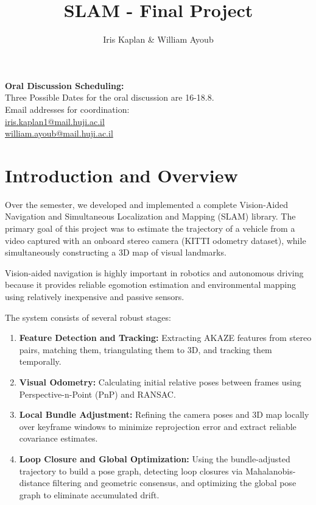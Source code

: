 \documentclass[12pt]{article}
\begin{document}
\title{SLAM - Final Project}
\author{Iris Kaplan \& William Ayoub}
\maketitle

\tableofcontents
\newpage

\vspace*{1em}
\noindent
\textbf{Oral Discussion Scheduling:} \\
Three Possible Dates for the oral discussion are 16-18.8. \\
Email addresses for coordination: \\
\href{mailto:iris.kaplan1@mail.huji.ac.il}{iris.kaplan1@mail.huji.ac.il} \\
\href{mailto:william.ayoub@mail.huji.ac.il}{william.ayoub@mail.huji.ac.il}
\vspace*{2em}


\section{Introduction and Overview}
\label{sec:intro}
Over the semester, we developed and implemented a complete Vision-Aided Navigation and Simultaneous Localization and Mapping (SLAM) library. The primary goal of this project was to estimate the trajectory of a vehicle from a video captured with an onboard stereo camera (KITTI odometry dataset), while simultaneously constructing a 3D map of visual landmarks.

Vision-aided navigation is highly important in robotics and autonomous driving because it provides reliable egomotion estimation and environmental mapping using relatively inexpensive and passive sensors.

The system consists of several robust stages:
\begin{enumerate}
    \item \textbf{Feature Detection and Tracking:} Extracting AKAZE features from stereo pairs, matching them, triangulating them to 3D, and tracking them temporally.
    \item \textbf{Visual Odometry:} Calculating initial relative poses between frames using Perspective-n-Point (PnP) and RANSAC.
    \item \textbf{Local Bundle Adjustment:} Refining the camera poses and 3D map locally over keyframe windows to minimize reprojection error and extract reliable covariance estimates.
    \item \textbf{Loop Closure and Global Optimization:} Using the bundle-adjusted trajectory to build a pose graph, detecting loop closures via Mahalanobis-distance filtering and geometric consensus, and optimizing the global pose graph to eliminate accumulated drift.
\end{enumerate}
\end{document}
